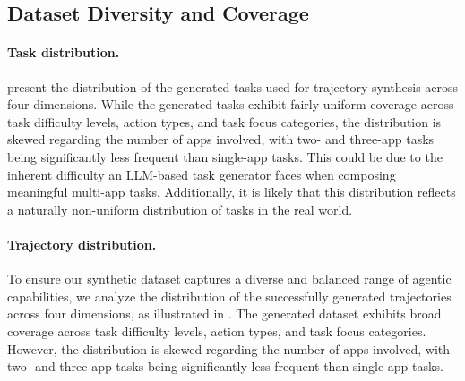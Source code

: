 \subsection{Dataset Diversity and Coverage}


\paragraph{Task distribution.}
 present the distribution of the generated tasks used for trajectory synthesis across four dimensions. While the generated tasks exhibit fairly uniform coverage across task difficulty levels, action types, and task focus categories, the distribution is skewed regarding the number of apps involved, with two- and three-app tasks being significantly less frequent than single-app tasks. This could be due to the inherent difficulty an LLM-based task generator faces when composing meaningful multi-app tasks. Additionally, it is likely that this distribution reflects a naturally non-uniform distribution of tasks in the real world.



\paragraph{Trajectory distribution.}
To ensure our synthetic dataset captures a diverse and balanced range of agentic capabilities, we analyze the distribution of the successfully generated trajectories across four dimensions, as illustrated in . The generated dataset exhibits broad coverage across task difficulty levels, action types, and task focus categories. However, the distribution is skewed regarding the number of apps involved, with two- and three-app tasks being significantly less frequent than single-app tasks. 


